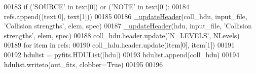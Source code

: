 \begin{DoxyCode}
00183             \textcolor{keywordflow}{if} (\textcolor{stringliteral}{'SOURCE'} \textcolor{keywordflow}{in} text[0]) \textcolor{keywordflow}{or} (\textcolor{stringliteral}{'NOTE'} \textcolor{keywordflow}{in} text[0]):
00184                 refs.append((text[0], text[1]))
00185 
00186     \hyperlink{namespacepyneb_1_1utils_1_1fits_a2c9c6cf69be4278cdfb529f3a8f3dced}{\_updateHeader}(coll\_hdu, input\_file, \textcolor{stringliteral}{'Collision strengths'}, elem, spec)
00187     \hyperlink{namespacepyneb_1_1utils_1_1fits_a2c9c6cf69be4278cdfb529f3a8f3dced}{\_updateHeader}(hdu, input\_file, \textcolor{stringliteral}{'Collision strengths'}, elem, spec)
00188     coll\_hdu.header.update(\textcolor{stringliteral}{'N\_LEVELS'}, NLevels)
00189     \textcolor{keywordflow}{for} item \textcolor{keywordflow}{in} refs:
00190         coll\_hdu.header.update(item[0], item[1])
00191 
00192     hdulist = pyfits.HDUList([hdu])
00193     hdulist.append(coll\_hdu)
00194     hdulist.writeto(out\_fits, clobber=\textcolor{keyword}{True})
00195 
00196 
\end{DoxyCode}
